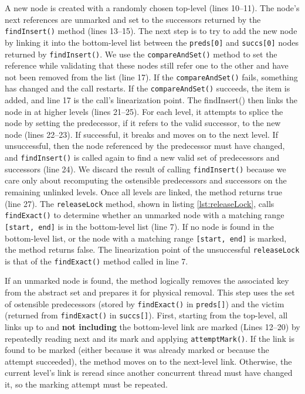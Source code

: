 A new node is created with a randomly chosen top-level (lines 10--11). The node's next references are unmarked and set to the successors returned by the \texttt{findInsert()} method (lines 13--15).
The next step is to try to add the new node by linking it into the bottom-level list between the \texttt{preds[0]} and \texttt{succs[0]} nodes returned by \texttt{findInsert()}. We use the \texttt{compareAndSet()} method to set the reference while validating that these nodes still refer one to the other and have not been removed from the list (line 17). If the  \texttt{compareAndSet()} fails, something has changed and the call restarts. If the  \texttt{compareAndSet()} succeeds, the item is added, and line 17 is the call's linearization point.
The {findInsert()} then links the node in at higher levels (lines 21--25). For each level, it attempts to splice the node by setting the predecessor, if it refers to the valid successor, to the new node (lines 22--23). If successful, it breaks and moves on to the next level. If unsuccessful, then the node referenced by the predecessor must have changed, and \texttt{findInsert()} is called again to find a new valid set of predecessors and successors (line 24). We discard the result of calling \texttt{findInsert()} because we care only about recomputing the ostensible predecessors and successors on the remaining unlinked levels. Once all levels are linked, the method returns true (line 27).
The \texttt{releaseLock} method, shown in listing \ref{lst:releaseLock}, calls \texttt{findExact()} to determine whether an unmarked node with a matching range \texttt{[start, end]} is in the bottom-level list (line 7). If no node is found in the bottom-level list, or the node with a matching range \texttt{[start, end]} is marked, the method returns false. The linearization point of the unsuccessful \texttt{releaseLock} is that of the \texttt{findExact()} method called in line 7.

If an unmarked node is found, the method logically removes the associated key from the abstract set and prepares it for physical removal. This step uses the set of ostensible predecessors (stored by \texttt{findExact()} in \texttt{preds[]}) and the victim (returned from \texttt{findExact()} in \texttt{succs[]}). First, starting from the top-level, all links up to and \textbf{not including} the bottom-level link are marked (Lines 12--20) by repeatedly reading next and its mark and applying \texttt{attemptMark()}. If the link is found to be marked (either because it was already marked or because the attempt succeeded), the method moves on to the next-level link. Otherwise, the current level's link is reread since another concurrent thread must have changed it, so the marking attempt must be repeated.

